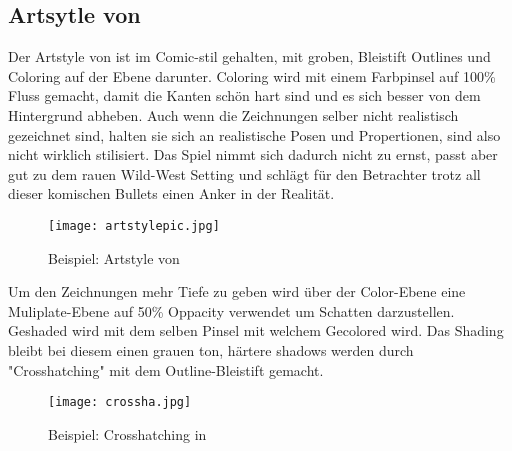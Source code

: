 \subsection{Artsytle von \FF}\label{subsec:artsytle}

Der Artstyle von \FF ist im Comic-stil gehalten, mit groben, Bleistift Outlines und Coloring auf der Ebene darunter.
Coloring wird mit einem Farbpinsel auf 100\% Fluss gemacht, damit die Kanten schön hart sind und es sich besser von dem Hintergrund abheben.
Auch wenn die Zeichnungen selber nicht realistisch gezeichnet sind, halten sie sich an realistische Posen und Propertionen, sind also nicht wirklich stilisiert.
Das Spiel nimmt sich dadurch nicht zu ernst, passt aber gut zu dem rauen Wild-West Setting und schlägt für den Betrachter trotz all dieser komischen Bullets
einen Anker in der Realität.

\begin{figure}[H]
    \texttt{[image: artstylepic.jpg]}
    \caption{Beispiel: Artstyle von \FF}
\end{figure}


Um den Zeichnungen mehr Tiefe zu geben wird über der Color-Ebene eine Muliplate-Ebene auf 50\% Oppacity verwendet um Schatten
darzustellen. Geshaded wird mit dem selben Pinsel mit welchem Gecolored wird. Das Shading bleibt bei diesem einen grauen ton,
härtere shadows werden durch "Crosshatching" mit dem Outline-Bleistift gemacht.

\begin{figure}[H]
    \texttt{[image: crossha.jpg]}
    \caption{Beispiel: Crosshatching in \FF}
\end{figure}

%


%

\renewcommand{\kapitelautor}{}
